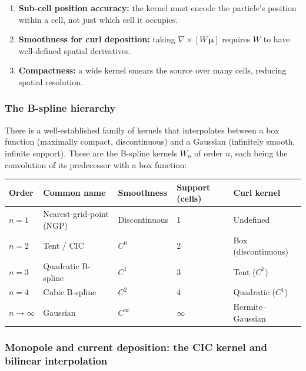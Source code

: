 \documentclass[11pt,a4paper]{article}
\begin{document}
\begin{enumerate}
  \item \textbf{Sub-cell position accuracy:} the kernel must encode the particle's position within a cell, not just which cell it occupies.
  \item \textbf{Smoothness for curl deposition:} taking $\nabla\times[W\,\boldsymbol{\mu}]$ requires $W$ to have well-defined spatial derivatives.
  \item \textbf{Compactness:} a wide kernel smears the source over many cells, reducing spatial resolution.
\end{enumerate}

\subsubsection*{The B-spline hierarchy}

There is a well-established family of kernels that interpolates between a box function (maximally compact, discontinuous) and a Gaussian (infinitely smooth, infinite support).  These are the B-spline kernels $W_n$ of order $n$, each being the convolution of its predecessor with a box function:

\begin{center}
\begin{tabular}{@{}lllll@{}}
\toprule
\textbf{Order} & \textbf{Common name} & \textbf{Smoothness} & \textbf{Support (cells)} & \textbf{Curl kernel} \\
\midrule
$n=1$ & Nearest-grid-point (NGP) & Discontinuous & 1 & Undefined \\
$n=2$ & Tent / CIC               & $C^0$         & 2 & Box (discontinuous) \\
$n=3$ & Quadratic B-spline        & $C^1$         & 3 & Tent ($C^0$) \\
$n=4$ & Cubic B-spline            & $C^2$         & 4 & Quadratic ($C^1$) \\
$n\to\infty$ & Gaussian          & $C^\infty$    & $\infty$ & Hermite--Gaussian \\
\bottomrule
\end{tabular}
\end{center}

\subsubsection*{Monopole and current deposition: the CIC kernel and bilinear interpolation}
\end{document}
